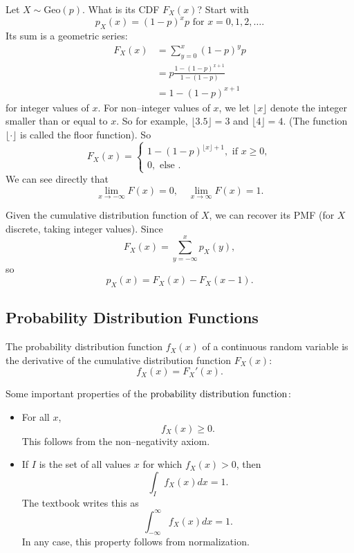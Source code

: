 \documentclass{ximera}
\begin{document}
\begin{example}
Let $X \sim \mathrm{Geo}(p)$. What is its CDF $F_X(x)$? Start with  
$$
p_X(x) = (1-p)^x p \text{ for } x=0,1,2,\ldots.
$$
Its sum is a geometric series:
\begin{align*}
F_X(x) &= \sum_{y=0}^x (1-p)^y p \\
&= p \frac{ 1 - (1-p)^{x+1}}{1- (1-p)} \\
&= 1 - (1-p)^{x+1}
\end{align*}
for integer values of $x$. For non--integer values of $x$, we let $\lfloor x \rfloor$ denote the integer smaller than or equal to $x$. So for example, $\lfloor 3.5\rfloor = 3$ and $\lfloor 4 \rfloor = 4$. (The function $\lfloor \cdot \rfloor$ is called the floor function). So
$$
F_X(x) = 
\begin{cases}
1- (1-p)^{\lfloor x \rfloor + 1}, \text{ if } x \geq 0,\\
0, \text{ else }.
\end{cases}
$$
We can see directly that
$$
\lim_{x\rightarrow -\infty} F(x) = 0, \quad \lim_{x \rightarrow \infty} F(x) = 1.
$$
\end{example}

Given the cumulative distribution function of $X$, we can recover its PMF (for $X$ discrete, taking integer values). Since
$$
F_X(x) = \sum_{y=-\infty}^x p_X(y),
$$
so 
$$
p_X(x) = F_X(x) - F_X(x-1).
$$



\subsection{Probability Distribution Functions}

\begin{definition}
The probability distribution function $f_X(x)$ of a continuous random variable is the derivative of the cumulative distribution function $F_X(x)$:
$$
f_X(x) = F_X'(x).
$$
\end{definition}
Some important properties of the $\text{probability distribution function}$:
\begin{itemize}
\item 
For all $x$,
$$
f_X(x) \geq 0.
$$
This follows from the non--negativity axiom.
\item
If $I$ is the set of all values $x$ for which $f_X(x) > 0$, then
$$
\int_{I} f_X(x) dx = 1.
$$
The textbook writes this as
$$
\int_{-\infty}^{\infty} f_X(x) dx = 1.
$$
In any case, this property follows from normalization.

\end{itemize}
\end{document}
